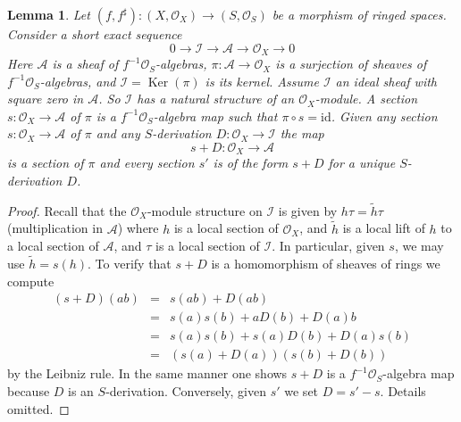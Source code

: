 \documentclass[10pt,a4paper]{amsart}
\theoremstyle{plain}
\newtheorem{lemma}[subsection]{Lemma}
\theoremstyle{definition}
\theoremstyle{remark}
\numberwithin{equation}{subsection}
\def\Ker{\mathop{\mathrm{Ker}}}
\begin{document}
\begin{lemma}
\label{lemma-double-structure-gives-derivation}
Let $(f, f^\sharp) : (X, \mathcal{O}_X) \to (S, \mathcal{O}_S)$
be a morphism of ringed spaces. Consider a short exact sequence
$$
0 \to \mathcal{I} \to \mathcal{A} \to \mathcal{O}_X \to 0
$$
Here $\mathcal{A}$ is a sheaf of $f^{-1}\mathcal{O}_S$-algebras,
$\pi : \mathcal{A} \to \mathcal{O}_X$ is a surjection
of sheaves of $f^{-1}\mathcal{O}_S$-algebras, and
$\mathcal{I} = \Ker(\pi)$ is its kernel. Assume $\mathcal{I}$ an ideal
sheaf with square zero in $\mathcal{A}$. So $\mathcal{I}$
has a natural structure of an $\mathcal{O}_X$-module.
A section $s : \mathcal{O}_X \to \mathcal{A}$ of $\pi$
is a $f^{-1}\mathcal{O}_S$-algebra map such that $\pi \circ s = \text{id}$.
Given any section $s : \mathcal{O}_X \to \mathcal{A}$
of $\pi$ and any $S$-derivation $D : \mathcal{O}_X \to \mathcal{I}$
the map
$$
s + D : \mathcal{O}_X \to \mathcal{A}
$$
is a section of $\pi$ and every section $s'$ is of the form $s + D$
for a unique $S$-derivation $D$.
\end{lemma}

\begin{proof}
Recall that the $\mathcal{O}_X$-module structure on $\mathcal{I}$
is given by $h \tau = \tilde h \tau$ (multiplication in $\mathcal{A}$)
where $h$ is a local section of $\mathcal{O}_X$, and
$\tilde h$ is a local lift of $h$ to a local
section of $\mathcal{A}$, and $\tau$ is a local section of $\mathcal{I}$.
In particular, given $s$, we may use $\tilde h = s(h)$.
To verify that $s + D$ is a homomorphism of sheaves of rings we
compute
\begin{eqnarray*}
(s + D)(ab) & = & s(ab) + D(ab) \\
& = & s(a)s(b) + aD(b) + D(a)b \\
& = & s(a) s(b) + s(a)D(b) + D(a)s(b) \\
& = & (s(a) + D(a))(s(b) + D(b))
\end{eqnarray*}
by the Leibniz rule. In the same manner one shows
$s + D$ is a $f^{-1}\mathcal{O}_S$-algebra
map because $D$ is an $S$-derivation. Conversely, given $s'$ we set
$D = s' - s$. Details omitted.
\end{proof}
\end{document}

